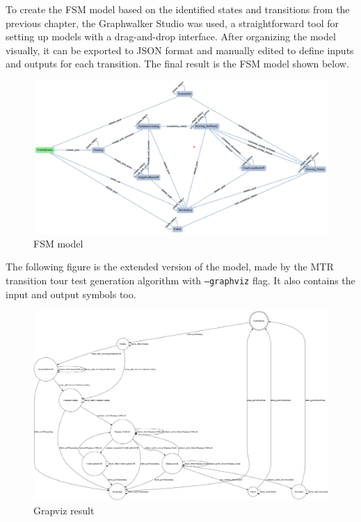 \documentclass[main.tex]{subfiles}
\begin{document}
To create the FSM model based on the identified states and transitions from the previous chapter, the Graphwalker Studio was used, a straightforward tool for setting up models with a drag-and-drop interface. After organizing the model visually, it can be exported to JSON format and manually edited to define inputs and outputs for each transition. The final result is the FSM model shown below.
\begin{figure}[H]
    \centering
    \includegraphics[width=\textwidth]{k8s_fsm_model.png}
    \caption{FSM model}
    \label{fig:fsm_model}
\end{figure}

The following figure is the extended version of the model, made by the MTR transition tour test generation algorithm with \texttt{--graphviz} flag. It also contains the input and output symbols too.
\begin{figure}[H]
    \centering
    \includegraphics[width=\textwidth]{graphviz_image.png}
    \caption{Grapviz result}
    \label{fig:grapviz}

\end{figure}
\end{document}
